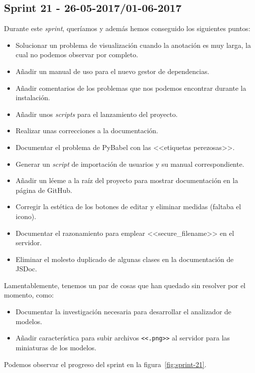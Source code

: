 \subsection{Sprint 21 - 26-05-2017/01-06-2017}
Durante este \textit{sprint}, queríamos y además hemos conseguido los siguientes puntos:
\begin{itemize}
	\item Solucionar un problema de visualización cuando la anotación es muy larga, la cual no podemos observar por completo.
	\item Añadir un manual de uso para el nuevo gestor de dependencias.
	\item Añadir comentarios de los problemas que nos podemos encontrar durante la instalación.
	\item Añadir unos \textit{scripts} para el lanzamiento del proyecto.
	\item Realizar unas correcciones a la documentación.
	\item Documentar el problema de PyBabel con las <<etiquetas perezosas>>.
	\item Generar un \textit{script} de importación de usuarios y su manual correspondiente.
	\item Añadir un léeme a la raíz del proyecto para mostrar documentación en la página de GitHub.
	\item Corregir la estética de los botones de editar y eliminar medidas (faltaba el icono).
	\item Documentar el razonamiento para emplear <<secure\_filename>> en el servidor.
	\item Eliminar el molesto duplicado de algunas clases en la documentación de JSDoc.
\end{itemize}

Lamentablemente, tenemos un par de cosas que han quedado sin resolver por el momento, como:
\begin{itemize}
	\item Documentar la investigación necesaria para desarrollar el analizador de modelos.
	\item Añadir característica para subir archivos \texttt{<<.png>>} al servidor para las miniaturas de los modelos.
\end{itemize}

Podemos observar el progreso del sprint en la figura~\ref{fig:sprint-21}.

